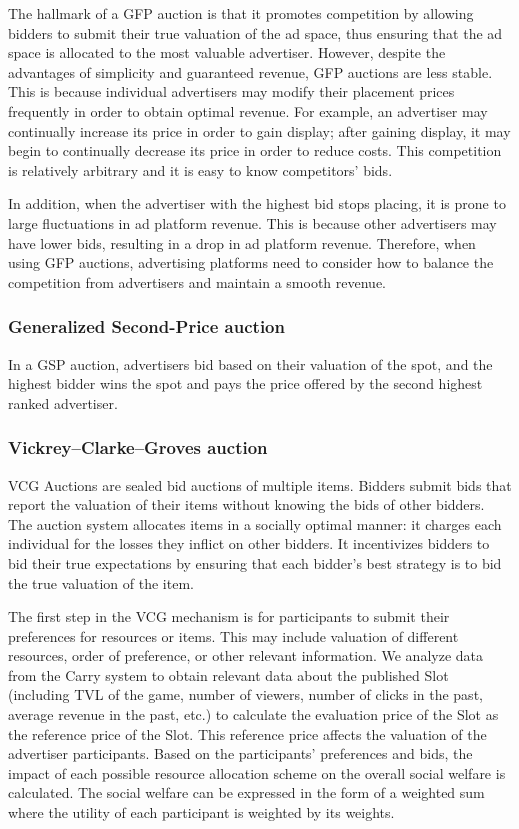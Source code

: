 The hallmark of a GFP auction is that it promotes competition by allowing bidders to submit their true valuation of the ad space, thus ensuring that the ad space is allocated to the most valuable advertiser. However, despite the advantages of simplicity and guaranteed revenue, GFP auctions are less stable. This is because individual advertisers may modify their placement prices frequently in order to obtain optimal revenue. For example, an advertiser may continually increase its price in order to gain display; after gaining display, it may begin to continually decrease its price in order to reduce costs. This competition is relatively arbitrary and it is easy to know competitors' bids.

In addition, when the advertiser with the highest bid stops placing, it is prone to large fluctuations in ad platform revenue. This is because other advertisers may have lower bids, resulting in a drop in ad platform revenue. Therefore, when using GFP auctions, advertising platforms need to consider how to balance the competition from advertisers and maintain a smooth revenue.


\subsubsection{Generalized Second-Price auction}
In a GSP auction, advertisers bid based on their valuation of the spot, and the highest bidder wins the spot and pays the price offered by the second highest ranked advertiser.

\subsubsection{Vickrey–Clarke–Groves auction}
VCG Auctions are sealed bid auctions of multiple items. Bidders submit bids that report the valuation of their items without knowing the bids of other bidders. The auction system allocates items in a socially optimal manner: it charges each individual for the losses they inflict on other bidders. It incentivizes bidders to bid their true expectations by ensuring that each bidder's best strategy is to bid the true valuation of the item.

The first step in the VCG mechanism is for participants to submit their preferences for resources or items. This may include valuation of different resources, order of preference, or other relevant information. We analyze data from the Carry system to obtain relevant data about the published Slot (including TVL of the game, number of viewers, number of clicks in the past, average revenue in the past, etc.) to calculate the evaluation price of the Slot as the reference price of the Slot. This reference price affects the valuation of the advertiser participants. Based on the participants' preferences and bids, the impact of each possible resource allocation scheme on the overall social welfare is calculated. The social welfare can be expressed in the form of a weighted sum where the utility of each participant is weighted by its weights.


